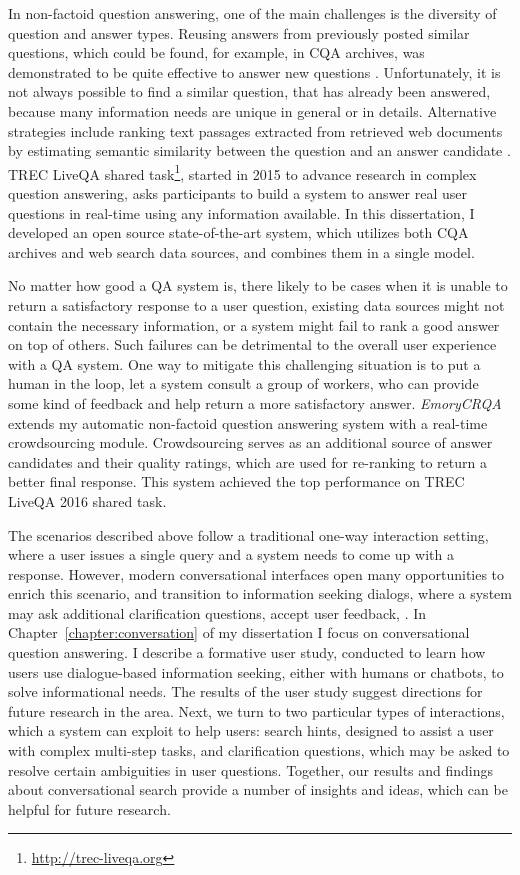 In non-factoid question answering, one of the main challenges is the diversity of question and answer types.
Reusing answers from previously posted similar questions, which could be found, for example, in CQA archives, was demonstrated to be quite effective to answer new questions \cite{carmel2000eresponder,Shtok:2012:LPA:2187836.2187939}.
Unfortunately, it is not always possible to find a similar question, that has already been answered, because many information needs are unique in general or in details.
Alternative strategies include ranking text passages extracted from retrieved web documents by estimating semantic similarity between the question and an answer candidate \cite{soricut2006automatic}.
TREC LiveQA shared task\footnote{\href{url}{http://trec-liveqa.org}}, started in 2015 to advance research in complex question answering, asks participants to build a system to answer real user questions in real-time using any information available.
In this dissertation, I developed an open source state-of-the-art system, which utilizes both CQA archives and web search data sources, and combines them in a single model.

No matter how good a QA system is, there likely to be cases when it is unable to return a satisfactory response to a user question, \eg existing data sources might not contain the necessary information, or a system might fail to rank a good answer on top of others.
Such failures can be detrimental to the overall user experience with a QA system.
One way to mitigate this challenging situation is to put a human in the loop, \eg let a system consult a group of workers, who can provide some kind of feedback and help return a more satisfactory answer.
\textit{EmoryCRQA} extends my automatic non-factoid question answering system with a real-time crowdsourcing module.
Crowdsourcing serves as an additional source of answer candidates and their quality ratings, which are used for re-ranking to return a better final response.
This system achieved the top performance on TREC LiveQA 2016 shared task.

The scenarios described above follow a traditional one-way interaction setting, where a user issues a single query and a system needs to come up with a response.
However, modern conversational interfaces open many opportunities to enrich this scenario, and transition to information seeking dialogs, where a system may ask additional clarification questions, accept user feedback, \etc.
In Chapter~\ref{chapter:conversation} of my dissertation I focus on conversational question answering. I describe a formative user study, conducted to learn how users use dialogue-based information seeking, either with humans or chatbots, to solve informational needs.
The results of the user study suggest directions for future research in the area.
Next, we turn to two particular types of interactions, which a system can exploit to help users: search hints, designed to assist a user with complex multi-step tasks, and clarification questions, which may be asked to resolve certain ambiguities in user questions.
Together, our results and findings about conversational search provide a number of insights and ideas, which can be helpful for future research.

